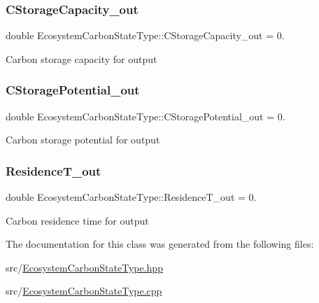 \subsubsection{\texorpdfstring{C\+Storage\+Capacity\+\_\+out}{CStorageCapacity\_out}}
{\footnotesize\ttfamily double Ecosystem\+Carbon\+State\+Type\+::\+C\+Storage\+Capacity\+\_\+out = 0.}

Carbon storage capacity for output \mbox{\label{class_ecosystem_carbon_state_type_a124871db6c94642d98997a081d99370b}} 
\subsubsection{\texorpdfstring{C\+Storage\+Potential\+\_\+out}{CStoragePotential\_out}}
{\footnotesize\ttfamily double Ecosystem\+Carbon\+State\+Type\+::\+C\+Storage\+Potential\+\_\+out = 0.}

Carbon storage potential for output \mbox{\label{class_ecosystem_carbon_state_type_aa98b5ed995c5f549c37d4131487d5707}} 
\subsubsection{\texorpdfstring{Residence\+T\+\_\+out}{ResidenceT\_out}}
{\footnotesize\ttfamily double Ecosystem\+Carbon\+State\+Type\+::\+Residence\+T\+\_\+out = 0.}

Carbon residence time for output 

The documentation for this class was generated from the following files\+:\begin{DoxyCompactItemize}
\item 
src/\mbox{\hyperlink{_ecosystem_carbon_state_type_8hpp}{Ecosystem\+Carbon\+State\+Type.\+hpp}}\item 
src/\mbox{\hyperlink{_ecosystem_carbon_state_type_8cpp}{Ecosystem\+Carbon\+State\+Type.\+cpp}}\end{DoxyCompactItemize}
